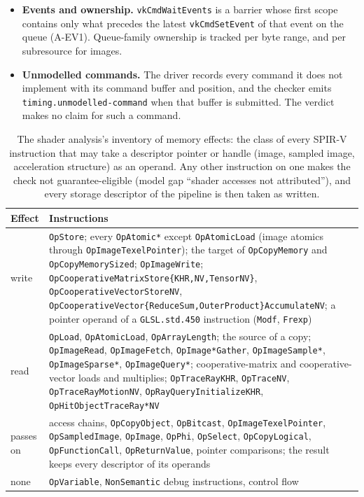 \documentclass[acmtog,anonymous,review]{acmart}
\newcommand{\code}[1]{\texttt{#1}}
\begin{document}
\begin{itemize}
  registry. Expansion applies to execution scopes only.
\item \textbf{Events and ownership.} \code{vkCmdWaitEvents} is a barrier whose first scope contains only what precedes
  the latest \code{vkCmdSetEvent} of that event on the queue (A-EV1). Queue-family ownership is tracked per byte
  range, and per subresource for images.
\item \textbf{Unmodelled commands.} The driver records every command it does not implement with its command buffer
  and position, and the checker emits \code{timing.unmodelled-command} when that buffer is submitted. The verdict
  makes no claim for such a command.
\end{itemize}
\begin{table}[t]
\caption{The shader analysis's inventory of memory effects: the class of every SPIR-V instruction that may take a
descriptor pointer or handle (image, sampled image, acceleration structure) as an operand. Any other instruction on
one makes the check not guarantee-eligible (model gap ``shader accesses not attributed''), and every storage
descriptor of the pipeline is then taken as written.}
\label{tab:s-effects}
\scriptsize
\begin{tabular}{@{}p{}p{}@{}}
\toprule
Effect & Instructions \\
\midrule
write & \code{OpStore}; every \code{OpAtomic*} except \code{OpAtomicLoad} (image atomics through
\code{OpImageTexelPointer}); the target of \code{OpCopyMemory} and \code{OpCopyMemorySized}; \code{OpImageWrite};
\code{OpCooperativeMatrixStore\{KHR,NV,TensorNV\}}, \code{OpCooperativeVectorStoreNV},
\code{OpCooperativeVector\{ReduceSum,OuterProduct\}AccumulateNV}; a pointer operand of a \code{GLSL.std.450}
instruction (\code{Modf}, \code{Frexp}) \\
read & \code{OpLoad}, \code{OpAtomicLoad}, \code{OpArrayLength}; the source of a copy; \code{OpImageRead},
\code{OpImageFetch}, \code{OpImage*Gather}, \code{OpImageSample*}, \code{OpImageSparse*}, \code{OpImageQuery*};
cooperative-matrix and cooperative-vector loads and multiplies; \code{OpTraceRayKHR}, \code{OpTraceNV},
\code{OpTraceRayMotionNV}, \code{OpRayQueryInitializeKHR}, \code{OpHitObjectTraceRay*NV} \\
passes on & access chains, \code{OpCopyObject}, \code{OpBitcast}, \code{OpImageTexelPointer},
\code{OpSampledImage}, \code{OpImage}, \code{OpPhi}, \code{OpSelect}, \code{OpCopyLogical}, \code{OpFunctionCall},
\code{OpReturnValue}, pointer comparisons; the result keeps every descriptor of its operands \\
none & \code{OpVariable}, \code{NonSemantic} debug instructions, control flow \\
\bottomrule
\end{tabular}
\end{table}
\end{document}
